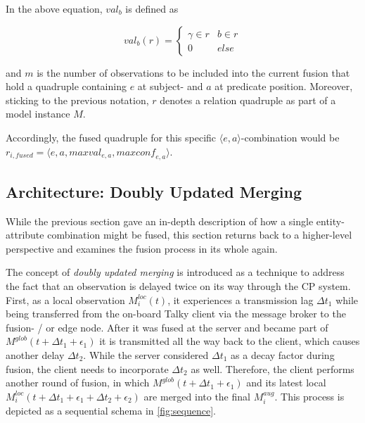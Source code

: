 In the above equation, $\textit{val}_b$ is defined as

$$
\textit{val}_b(r) = 
	\begin{cases}
	\gamma \in r & b \in r \\
	0 & else
	\end{cases}
$$

and $m$ is the number of observations to be included into the current fusion that hold a quadruple containing $e$ at subject- and $a$ at predicate position. Moreover, sticking to the previous notation, $r$ denotes a relation quadruple as part of a model instance $M$.

Accordingly, the fused quadruple for this specific $\langle e, a \rangle$-combination would be $r_{i,fused} = \langle e, a, \textit{maxval}_{e,a}, \textit{maxconf}_{e,a} \rangle$.

\subsection{Architecture: Doubly Updated Merging}
\label{subsec:concept_design:fusion_architecture}

While the previous section gave an in-depth description of how a single entity-attribute combination might be fused, this section returns back to a higher-level perspective and examines the fusion process in its whole again.

The concept of \textit{doubly updated merging} is introduced as a technique to address the fact that an observation is delayed twice on its way through the CP system. First, as a local observation $M^{loc}_i(t)$, it experiences a transmission lag $\Delta t_1$ while being transferred from the on-board Talky client via the message broker to the fusion- / or edge node. After it was fused at the server and became part of $M^{glob}(t+\Delta t_1+\epsilon_1)$ it is transmitted all the way back to the client, which causes another delay $\Delta t_2$. While the server considered $\Delta t_1$ as a decay factor during fusion, the client needs to incorporate $\Delta t_2$ as well. Therefore, the client performs another round of fusion, in which $M^{glob}(t+\Delta t_1+\epsilon_1)$ and its latest local $M^{loc}_i(t+\Delta t_1+\epsilon_1+\Delta t_2+\epsilon_2)$ are merged into the final $M^{aug}_i$. This process is depicted as a sequential schema in \cref{fig:sequence}.

